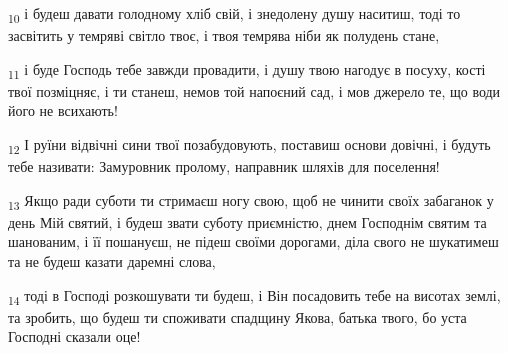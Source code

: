 \begin{tcolorbox}
\textsubscript{10} і будеш давати голодному хліб свій, і знедолену душу наситиш, тоді то засвітить у темряві світло твоє, і твоя темрява ніби як полудень стане,
\end{tcolorbox}
\begin{tcolorbox}
\textsubscript{11} і буде Господь тебе завжди провадити, і душу твою нагодує в посуху, кості твої позміцняє, і ти станеш, немов той напоєний сад, і мов джерело те, що води його не всихають!
\end{tcolorbox}
\begin{tcolorbox}
\textsubscript{12} І руїни відвічні сини твої позабудовують, поставиш основи довічні, і будуть тебе називати: Замуровник пролому, направник шляхів для поселення!
\end{tcolorbox}
\begin{tcolorbox}
\textsubscript{13} Якщо ради суботи ти стримаєш ногу свою, щоб не чинити своїх забаганок у день Мій святий, і будеш звати суботу приємністю, днем Господнім святим та шанованим, і її пошануєш, не підеш своїми дорогами, діла свого не шукатимеш та не будеш казати даремні слова,
\end{tcolorbox}
\begin{tcolorbox}
\textsubscript{14} тоді в Господі розкошувати ти будеш, і Він посадовить тебе на висотах землі, та зробить, що будеш ти споживати спадщину Якова, батька твого, бо уста Господні сказали оце!
\end{tcolorbox}
